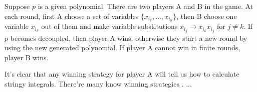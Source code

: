 \documentclass[12pt]{article}
\theoremstyle{definition}
\theoremstyle{plain}
\begin{document}
Suppose $p$ is a given polynomial. There are two players A and B in the game. 
At each round, first A choose a set of variables $\{x_{i_1},\dots,x_{i_n}\}$, then
B choose one variable $x_{i_k}$ out of them and make variable substitutions
$x_{i_j} \to x_{i_k}x_{i_j}$ for $j\neq k$.
If $p$ becomes decoupled, then player A wins, otherwise they start a new round by using the 
new generated polynomial. If player A cannot win in finite rounds, player B wins.


It's clear that any winning strategy for player A will tell us how to 
calculate stringy integrals. There're many know winning strategies
\cite{spivakovsky1983solution,zeillinger2006short,hauser2003hironaka}.
... 

% 
% 
% 
\end{document}
